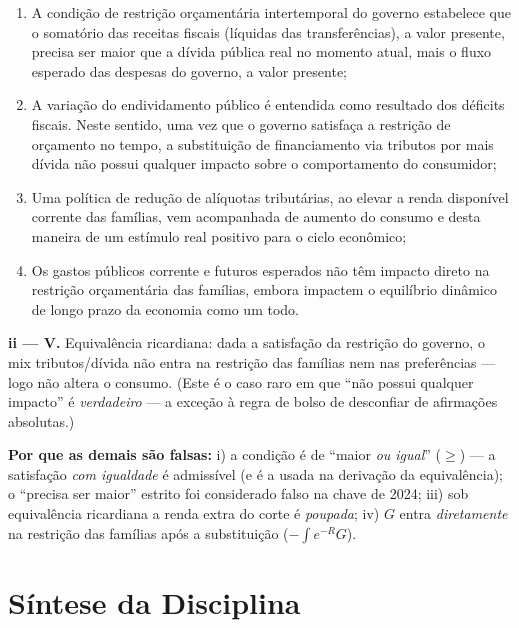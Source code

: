 \documentclass[12pt, a4paper]{article}
\begin{document}
\begin{enumerate}[label=\roman*)]
\item A condição de restrição orçamentária intertemporal do governo estabelece
que o somatório das receitas fiscais (líquidas das transferências), a valor
presente, precisa ser maior que a dívida pública real no momento atual, mais o
fluxo esperado das despesas do governo, a valor presente;
\item A variação do endividamento público é entendida como resultado dos
déficits fiscais. Neste sentido, uma vez que o governo satisfaça a restrição
de orçamento no tempo, a substituição de financiamento via tributos por mais
dívida não possui qualquer impacto sobre o comportamento do consumidor;
\item Uma política de redução de alíquotas tributárias, ao elevar a renda
disponível corrente das famílias, vem acompanhada de aumento do consumo e
desta maneira de um estímulo real positivo para o ciclo econômico;
\item Os gastos públicos corrente e futuros esperados não têm impacto direto
na restrição orçamentária das famílias, embora impactem o equilíbrio dinâmico
de longo prazo da economia como um todo.
\end{enumerate}

\begin{correctbox}[title={Resposta: ii) --- reciclada: gabarito oficial da P2 2024 (Q5-iii)}]
\textbf{ii --- V.} Equivalência ricardiana: dada a satisfação da restrição do
governo, o mix tributos/dívida não entra na restrição das famílias nem nas
preferências --- logo não altera o consumo. (Este é o caso raro em que ``não
possui qualquer impacto'' é \emph{verdadeiro} --- a exceção à regra de bolso
de desconfiar de afirmações absolutas.)

\textbf{Por que as demais são falsas:} i) a condição é de ``maior \emph{ou
igual}'' ($\geq$) --- a satisfação \emph{com igualdade} é admissível (e é a
usada na derivação da equivalência); o ``precisa ser maior'' estrito foi
considerado falso na chave de 2024; iii) sob equivalência ricardiana a renda
extra do corte é \emph{poupada}; iv) $G$ entra \emph{diretamente} na restrição
das famílias após a substituição ($-\int e^{-R}G$).
\end{correctbox}

\section{Síntese da Disciplina}
\end{document}
